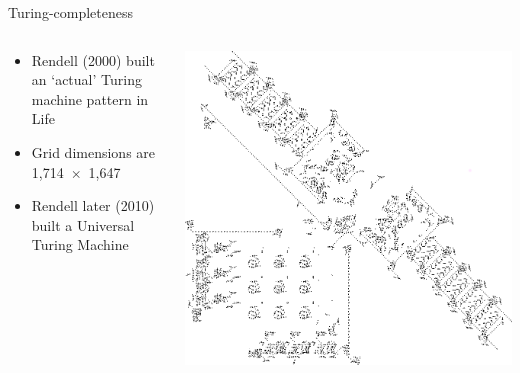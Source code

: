 \documentclass{beamer}
\begin{document}
\begin{frame}{Turing-completeness}
	\begin{columns}
		\begin{column}{0.3\paperwidth}
		\begin{itemize}
			\item Rendell (2000) built an `actual' Turing machine pattern in Life
			\item Grid dimensions are 1,714~$\times$~1,647
			\item Rendell later (2010) built a Universal Turing Machine
		\end{itemize}
	\end{column}

	\begin{column}{0.7\paperwidth}
		\begin{center}
			\includegraphics[width=\textwidth,height=0.65\textheight,keepaspectratio]{rendell-tm}
		\end{center}
	\end{column}
	\end{columns}
\end{frame}

\end{document}

